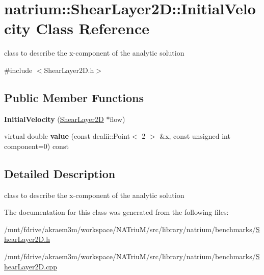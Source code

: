 \hypertarget{classnatrium_1_1ShearLayer2D_1_1InitialVelocity}{
\section{natrium::ShearLayer2D::InitialVelocity Class Reference}
\label{classnatrium_1_1ShearLayer2D_1_1InitialVelocity}
}


class to describe the x-\/component of the analytic solution  


{\ttfamily \#include $<$ShearLayer2D.h$>$}\subsection*{Public Member Functions}
\begin{DoxyCompactItemize}
\item 
\hypertarget{classnatrium_1_1ShearLayer2D_1_1InitialVelocity_a6fde9316639e0161172b8ec97871ecb3}{
{\bfseries InitialVelocity} (\hyperlink{classnatrium_1_1ShearLayer2D}{ShearLayer2D} $\ast$flow)}
\label{classnatrium_1_1ShearLayer2D_1_1InitialVelocity_a6fde9316639e0161172b8ec97871ecb3}

\item 
\hypertarget{classnatrium_1_1ShearLayer2D_1_1InitialVelocity_a28ddbc282ade4d15e22fbf6e2542fdb8}{
virtual double {\bfseries value} (const dealii::Point$<$ 2 $>$ \&x, const unsigned int component=0) const }
\label{classnatrium_1_1ShearLayer2D_1_1InitialVelocity_a28ddbc282ade4d15e22fbf6e2542fdb8}

\end{DoxyCompactItemize}


\subsection{Detailed Description}
class to describe the x-\/component of the analytic solution 

The documentation for this class was generated from the following files:\begin{DoxyCompactItemize}
\item 
/mnt/fdrive/akraem3m/workspace/NATriuM/src/library/natrium/benchmarks/\hyperlink{ShearLayer2D_8h}{ShearLayer2D.h}\item 
/mnt/fdrive/akraem3m/workspace/NATriuM/src/library/natrium/benchmarks/\hyperlink{ShearLayer2D_8cpp}{ShearLayer2D.cpp}\end{DoxyCompactItemize}
